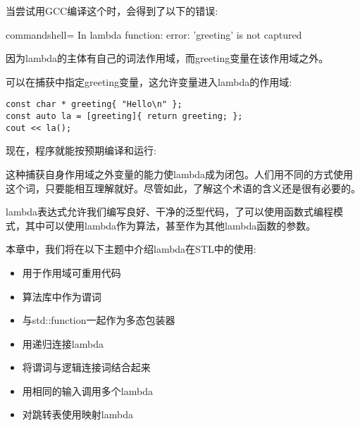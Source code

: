 当尝试用GCC编译这个时，会得到了以下的错误:

\begin{tcblisting}{commandshell={}}
In lambda function:
error: 'greeting' is not captured
\end{tcblisting}

因为lambda的主体有自己的词法作用域，而greeting变量在该作用域之外。

可以在捕获中指定greeting变量，这允许变量进入lambda的作用域:

\begin{lstlisting}[style=styleCXX]
const char * greeting{ "Hello\n" };
const auto la = [greeting]{ return greeting; };
cout << la();
\end{lstlisting}

现在，程序就能按预期编译和运行:


这种捕获自身作用域之外变量的能力使lambda成为闭包。人们用不同的方式使用这个词，只要能相互理解就好。尽管如此，了解这个术语的含义还是很有必要的。

lambda表达式允许我们编写良好、干净的泛型代码，了可以使用函数式编程模式，其中可以使用lambda作为算法，甚至作为其他lambda函数的参数。

本章中，我们将在以下主题中介绍lambda在STL中的使用:

\begin{itemize}
\item 
用于作用域可重用代码

\item 
算法库中作为谓词

\item 
与std::function一起作为多态包装器

\item 
用递归连接lambda

\item 
将谓词与逻辑连接词结合起来

\item 
用相同的输入调用多个lambda

\item 
对跳转表使用映射lambda
\end{itemize}





